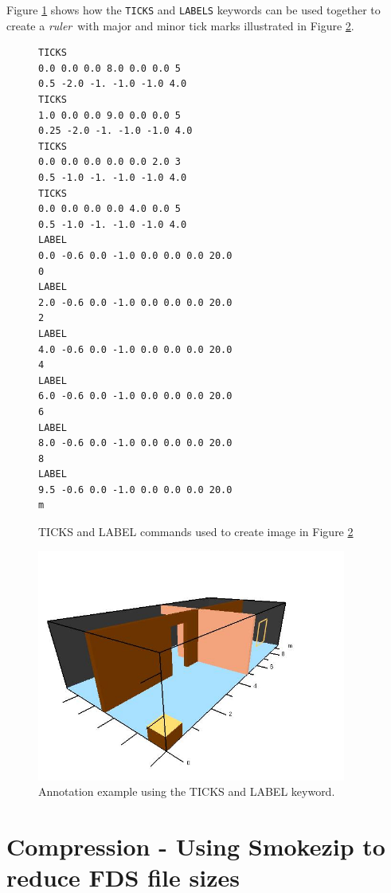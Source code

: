 \documentclass[11pt,twoside]{book}
\newcommand{\figoptions}{hbp}
\begin{document}
Figure \ref{figticklabels} shows how the {\tt TICKS} and
{\tt LABELS} keywords can be used together to create a
{\em ruler}\ with major and minor tick marks illustrated in Figure
\ref{figticklabelexample}.

\begin{figure}[\figoptions]
{\small
\begin{verbatim}
TICKS
0.0 0.0 0.0 8.0 0.0 0.0 5
0.5 -2.0 -1. -1.0 -1.0 4.0
TICKS
1.0 0.0 0.0 9.0 0.0 0.0 5
0.25 -2.0 -1. -1.0 -1.0 4.0
TICKS
0.0 0.0 0.0 0.0 0.0 2.0 3
0.5 -1.0 -1. -1.0 -1.0 4.0
TICKS
0.0 0.0 0.0 0.0 4.0 0.0 5
0.5 -1.0 -1. -1.0 -1.0 4.0
LABEL
0.0 -0.6 0.0 -1.0 0.0 0.0 0.0 20.0
0
LABEL
2.0 -0.6 0.0 -1.0 0.0 0.0 0.0 20.0
2
LABEL
4.0 -0.6 0.0 -1.0 0.0 0.0 0.0 20.0
4
LABEL
6.0 -0.6 0.0 -1.0 0.0 0.0 0.0 20.0
6
LABEL
8.0 -0.6 0.0 -1.0 0.0 0.0 0.0 20.0
8
LABEL
9.5 -0.6 0.0 -1.0 0.0 0.0 0.0 20.0
m
\end{verbatim}
}
\caption{ TICKS and LABEL commands used to create image in Figure \ref{figticklabelexample}}
\label{figticklabels}%
\end{figure}

\begin{figure}[\figoptions]
\begin{center}
\includegraphics[height=3.0in]{figures/ticklabels}
\end{center}
\caption{ Annotation example using the TICKS and LABEL keyword. }
\label{figticklabelexample}%
\end{figure}


\chapter{Compression - Using Smokezip to reduce FDS file sizes}
\end{document}
